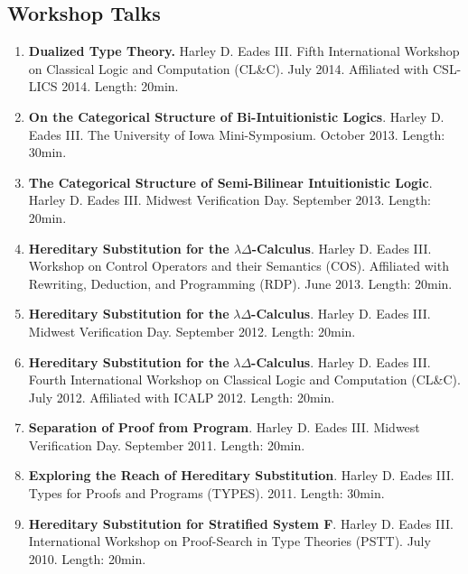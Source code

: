 \documentclass{article}
\begin{document}
  \subsection{Workshop Talks}
    \begin{enumerate}
    \item \textbf{Dualized Type Theory.} Harley D. Eades III.
      Fifth International Workshop on Classical Logic and Computation (CL\&C). July 2014. Affiliated with
      CSL-LICS 2014. Length: 20min.
      
    \item \textbf{On the Categorical Structure of Bi-Intuitionistic Logics}. Harley D. Eades III.
      The University of Iowa Mini-Symposium. October 2013. Length: 30min.
      
    \item \textbf{The Categorical Structure of Semi-Bilinear Intuitionistic Logic}. Harley D. Eades III.
      Midwest Verification Day. September 2013. Length: 20min.
      
    \item \textbf{Hereditary Substitution for the $\lambda\Delta$-Calculus}. Harley D. Eades III. 
      Workshop on Control Operators and their Semantics (COS). 
      Affiliated with Rewriting, Deduction, and Programming (RDP). June 2013. Length: 20min.
      
    \item \textbf{Hereditary Substitution for the }$\lambda\Delta$\textbf{-Calculus}. Harley D. Eades III.
      Midwest Verification Day. September 2012. Length: 20min.
      
    \item \textbf{Hereditary Substitution for the }$\lambda\Delta$\textbf{-Calculus}. Harley D. Eades III.
      Fourth International Workshop on Classical Logic and Computation (CL\&C). July 2012. Affiliated with ICALP 2012.
      Length: 20min.
      
    \item \textbf{Separation of Proof from Program}.
      Harley D. Eades III. Midwest Verification Day. September 2011. Length: 20min.

    \item \textbf{Exploring the Reach of Hereditary Substitution}. Harley D. Eades III.
      Types for Proofs and Programs (TYPES). 2011. Length: 30min.

    \item \textbf{Hereditary Substitution for Stratified System F}. Harley D. Eades III. 
      International Workshop on Proof-Search in Type Theories (PSTT). July 2010. Length: 20min.
    \end{enumerate}
\end{document}
